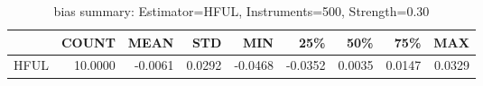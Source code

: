 \begin{table}[ht]
\centering
\caption{bias summary: Estimator=HFUL, Instruments=500, Strength=0.30}
\begin{tabular}{lrrrrrrrr}
\toprule
 & COUNT & MEAN & STD & MIN & 25\% & 50\% & 75\% & MAX \\
\midrule
HFUL & 10.0000 & -0.0061 & 0.0292 & -0.0468 & -0.0352 & 0.0035 & 0.0147 & 0.0329 \\
\bottomrule
\end{tabular}
\end{table}
